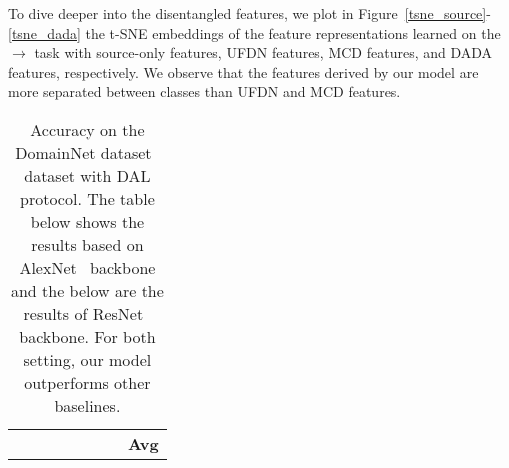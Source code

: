 \documentclass{article}
\newcommand{\BU}[1]{\color{black!40!green}\textbf{#1}}
\newcommand{\BV}[1]{\color{black!10!blue}{\em #1}}
\begin{document}
To dive deeper into the disentangled features, we plot in Figure~\ref{tsne_source}-\ref{tsne_dada} the t-SNE embeddings of the feature representations learned on the {\BV{sv}}$\rightarrow${\BV{mm,mt,up,sy}} task with source-only features, UFDN features, MCD features, and DADA features, respectively. We observe that the features derived by our model are more separated between classes than UFDN and MCD features. 







\begin{table*}[t]
\vspace{-0.3cm}
\caption{Accuracy on the DomainNet dataset~\cite{domainnet} dataset with DAL protocol. The table below shows the results based on AlexNet~\cite{alexnet} backbone and the below are the results of ResNet~\cite{resnet} backbone. For both setting, our model outperforms other baselines. } \label{table_lsdac}
\vspace{0.1in}
\centering
\small
{
\begin{tabular}{c c c c c c  c c}
\Xhline{1.0pt}
 & 
\multirow{2}{1.4cm}{\scriptsize{\BV{clp$\rightarrow$inf,pnt\\qdr,rel,skt}} } &  
\multirow{2}{1.4cm}{\scriptsize{\BV{inf$\rightarrow$clp,pnt,\\qdr,rel,skt}} } & 
\multirow{2}{1.4cm}{\scriptsize{\BV{pnt$\rightarrow$clp,inf,\\qdr,rel,skt}} }& 
\multirow{2}{1.4cm}{\scriptsize{\BV{qdr$\rightarrow$clp,inf,\\pnt,rel,skt}} }&    
\multirow{2}{1.4cm}{\scriptsize{\BV{rel$\rightarrow$clp,inf,\\pnt,qdr,skt }} } & 
\multirow{2}{1.4cm}{\scriptsize{\BV{skt$\rightarrow$clp,inf,\\pnt,qdr,rel }} } & 
\multirow{2}{0.5cm}{{\BU{Avg}}} \\ 
&&&&&&& \\





\end{tabular}}
\end{table*}
\end{document}
